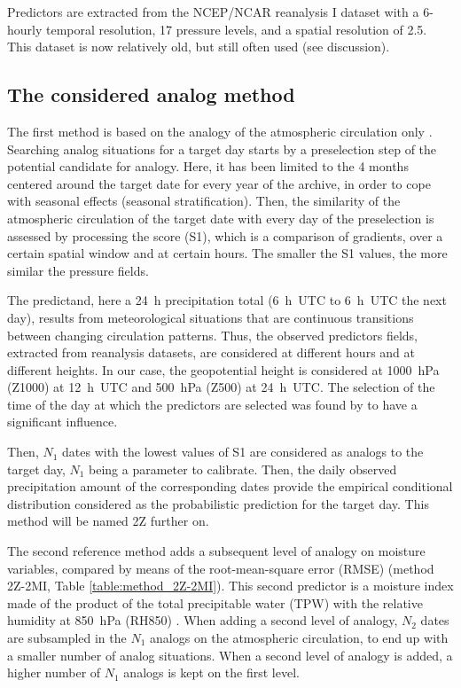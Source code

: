 \documentclass[hess, manuscript]{copernicus}
\begin{document}
Predictors are extracted from the NCEP/NCAR reanalysis I \citep{Kalnay1996} dataset with a 6-hourly temporal resolution, 17 pressure levels, and a spatial resolution of 2.5\degree. This dataset is now relatively old, but still often used (see discussion).

\subsection{The considered analog method}
\label{sec:analog_method}

The first method is based on the analogy of the atmospheric circulation only \citep[Table \ref{table:method_2Z},][]{Obled2002, Bontron2005, Marty2012}. Searching analog situations for a target day starts by a preselection step of the potential candidate for analogy. Here, it has been limited to the 4 months centered around the target date for every year of the archive, in order to cope with seasonal effects (seasonal stratification). Then, the similarity of the atmospheric circulation of the target date with every day of the preselection is assessed by processing the \citet{Teweles1954} score (S1), which is a comparison of gradients, over a certain spatial window and at certain hours. The smaller the S1 values, the more similar the pressure fields.

The predictand, here a 24~h precipitation total (6~h~UTC to 6~h~UTC the next day), results from meteorological situations that are continuous transitions between changing circulation patterns. Thus, the observed predictors fields, extracted from reanalysis datasets, are considered at different hours and at different heights. In our case, the geopotential height is considered at 1000~hPa (Z1000) at 12~h~UTC and 500~hPa (Z500) at 24~h~UTC. The selection of the time of the day at which the predictors are selected was found by \citet{Bontron2004} to have a significant influence.

Then, $N_{1}$ dates with the lowest values of S1 are considered as analogs to the target day, $N_{1}$ being a parameter to calibrate. Then, the daily observed precipitation amount of the corresponding dates provide the empirical conditional distribution considered as the probabilistic prediction for the target day. This method will be named 2Z further on.

The second reference method adds a subsequent level of analogy on moisture variables, compared by means of the root-mean-square error (RMSE) (method 2Z-2MI, Table \ref{table:method_2Z-2MI}). This second predictor is a moisture index made of the product of the total precipitable water (TPW) with the relative humidity at 850~hPa (RH850) \citep{Bontron2004}. When adding a second level of analogy, $N_{2}$ dates are subsampled in the $N_{1}$ analogs on the atmospheric circulation, to end up with a smaller number of analog situations. When a second level of analogy is added, a higher number of $N_{1}$ analogs is kept on the first level.
\end{document}
